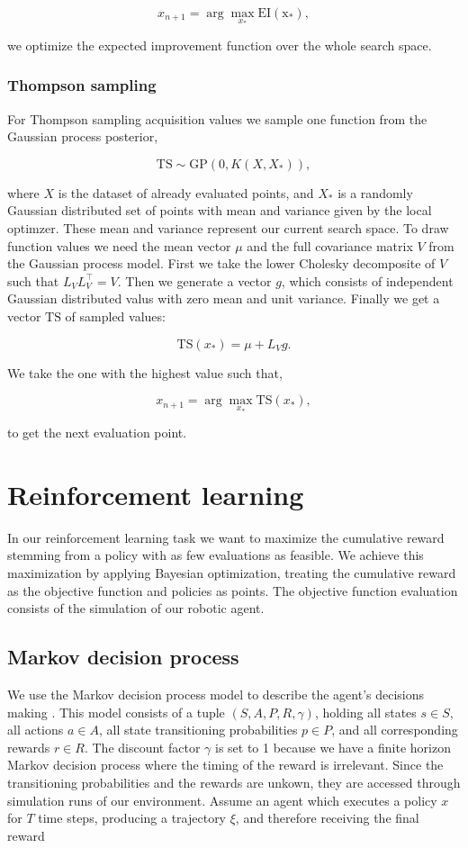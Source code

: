 $$x_{n+1} = \arg \max_{x_*} \mathrm{EI(x_*)},$$

we optimize the expected improvement function over the whole search space.

\subsubsection{Thompson sampling}
For Thompson sampling acquisition values we sample one function from the Gaussian process posterior,

$$\mathrm{TS}\sim \mathrm{GP}(0,K(X,X_*)),$$

where $X$ is the dataset of already evaluated points, and $X_*$ is a randomly Gaussian distributed set of points with mean and variance given by the local optimzer. These mean and variance represent our current search space.
To draw function values we need the mean vector $\mu$ and the full covariance matrix $V$ from the Gaussian process model. First we take the lower Cholesky decomposite of $V$ such that $L_V L_V^\top = V$. Then we generate a vector $g$, which consists of independent Gaussian distributed valus with zero mean and unit variance. Finally we get a vector $\mathrm{TS}$ of sampled values:

$$\mathrm{TS}(x_*) = \mu + L_V g.$$

We take the one with the highest value such that,

$$x_{n+1} = \arg \max_{x_*} \mathrm{TS}(x_*),$$

to get the next evaluation point.

\section{Reinforcement learning}

In our reinforcement learning task we want to maximize the cumulative reward stemming from a policy with as few evaluations as feasible. We achieve this maximization by applying Bayesian optimization, treating the cumulative reward as the objective function and policies as points. The objective function evaluation consists of the simulation of our robotic agent.

\subsection{Markov decision process}
We use the Markov decision process model to describe the agent's decisions making \cite{sutton1998reinforcement}. This model consists of a tuple $(S,A,P,R,\gamma)$, holding all states $s \in S$, all actions $a \in A$, all state transitioning probabilities $p \in P$, and all corresponding rewards $r \in R$. The discount factor $\gamma$ is set to 1 because we have a finite horizon Markov decision process where the timing of the reward is irrelevant. Since the transitioning probabilities and the rewards are unkown, they are accessed through simulation runs of our environment. Assume an agent which executes a policy $x$ for $T$ time steps, producing a trajectory $\xi$, and therefore receiving the final reward

